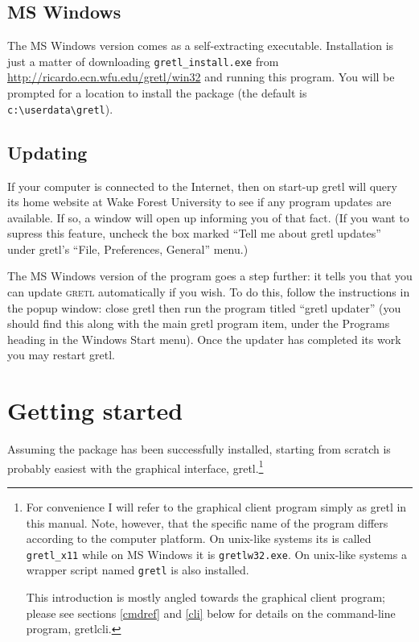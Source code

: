 \documentclass{article}
\begin{document}
\subsection{MS Windows}

The MS Windows version comes as a self-extracting executable.
Installation is just a matter of downloading
\texttt{gretl\_install.exe} from
\url{http://ricardo.ecn.wfu.edu/gretl/win32} and running this
program.  You will be prompted for a location to install the package
(the default is \verb+c:\userdata\gretl+).  

\subsection{Updating}

If your computer is connected to the Internet, then on start-up
\textsf{gretl} will query its home website at Wake Forest University
to see if any program updates are available.  If so, a window will
open up informing you of that fact.  (If you want to supress this
feature, uncheck the box marked ``Tell me about gretl updates'' under
\textsf{gretl}'s ``File, Preferences, General'' menu.)

The MS Windows version of the program goes a step further: it tells
you that you can update \textsc{gretl} automatically if you wish.  To
do this, follow the instructions in the popup window: close
\textsf{gretl} then run the program titled ``gretl updater'' (you
should find this along with the main \textsf{gretl} program item,
under the Programs heading in the Windows Start menu).  Once the
updater has completed its work you may restart \textsf{gretl}.

\section{Getting started}
\label{start}

Assuming the package has been successfully installed, starting from
scratch is probably easiest with the graphical interface,
\textsf{gretl}.\footnote{For convenience I will refer to the graphical
  client program simply as \textsf{gretl} in this manual.  Note,
  however, that the specific name of the program differs according to
  the computer platform.  On unix-like systems its is called
  \texttt{gretl\_x11} while on MS Windows it is
  \texttt{gretlw32.exe}.  On unix-like systems a wrapper script named
  \texttt{gretl} is also installed.
  
  This introduction is mostly angled towards the graphical client
  program; please see sections \ref{cmdref} and \ref{cli} below for
  details on the command-line program, \textsf{gretlcli}.}
\end{document}
